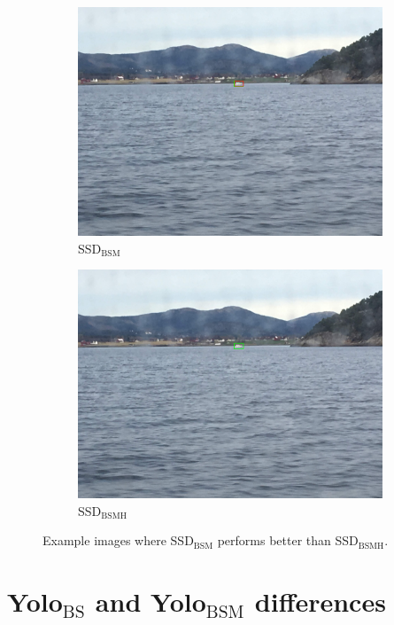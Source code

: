 \begin{figure}[h!]
\begin{subfigure}{.5\textwidth}
  \centering
  \includegraphics[width=0.8\linewidth]{results/case_buildings/ssdtrf/ssd2/2better/IMG_2463.jpg}
  \caption{SSD$_{\text{BSM}}$}
\end{subfigure}%
\begin{subfigure}{.5\textwidth}
  \centering
  \includegraphics[width=.8\linewidth]{results/case_buildings/ssdtrf/ssd3/2better/IMG_2463.jpg}
  \caption{SSD$_{\text{BSMH}}$}
\end{subfigure}
\caption{Example images where SSD$_{\text{BSM}}$ performs better than SSD$_{\text{BSMH}}$.}
\label{img:ssd_trf_3better}
\end{figure}


\section{Yolo$_{\text{BS}}$ and Yolo$_{\text{BSM}}$ differences}

